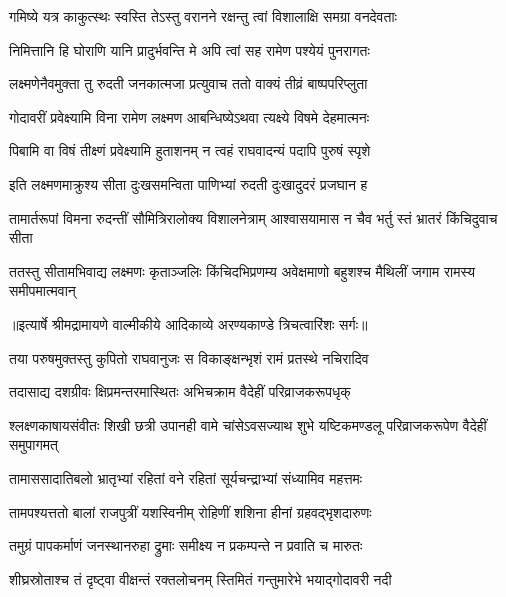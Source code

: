 \twolineshloka
{गमिष्ये यत्र काकुत्स्थः स्वस्ति तेऽस्तु वरानने}
{रक्षन्तु त्वां विशालाक्षि समग्रा वनदेवताः} %

\twolineshloka
{निमित्तानि हि घोराणि यानि प्रादुर्भवन्ति मे}
{अपि त्वां सह रामेण पश्येयं पुनरागतः} %

\twolineshloka
{लक्ष्मणेनैवमुक्ता तु रुदती जनकात्मजा}
{प्रत्युवाच ततो वाक्यं तीव्रं बाष्पपरिप्लुता} %

\twolineshloka
{गोदावरीं प्रवेक्ष्यामि विना रामेण लक्ष्मण}
{आबन्धिष्येऽथवा त्यक्ष्ये विषमे देहमात्मनः} %

\twolineshloka
{पिबामि वा विषं तीक्ष्णं प्रवेक्ष्यामि हुताशनम्}
{न त्वहं राघवादन्यं पदापि पुरुषं स्पृशे} %

\twolineshloka
{इति लक्ष्मणमाक्रुश्य सीता दुःखसमन्विता}
{पाणिभ्यां रुदती दुःखादुदरं प्रजघान ह} %

\fourlineindentedshloka
{तामार्तरूपां विमना रुदन्तीं}
{ सौमित्रिरालोक्य विशालनेत्राम्}
{आश्वासयामास न चैव भर्तु}
{स्तं भ्रातरं किंचिदुवाच सीता} %

\fourlineindentedshloka
{ततस्तु सीतामभिवाद्य लक्ष्मणः}
{ कृताञ्जलिः किंचिदभिप्रणम्य}
{अवेक्षमाणो बहुशश्च मैथिलीं}
{ जगाम रामस्य समीपमात्मवान्} %


{॥इत्यार्षे श्रीमद्रामायणे वाल्मीकीये आदिकाव्ये अरण्यकाण्डे त्रिचत्वारिंशः सर्गः॥}


\twolineshloka
{तया परुषमुक्तस्तु कुपितो राघवानुजः}
{स विकाङ्क्षन्भृशं रामं प्रतस्थे नचिरादिव} %

\twolineshloka
{तदासाद्य दशग्रीवः क्षिप्रमन्तरमास्थितः}
{अभिचक्राम वैदेहीं परिव्राजकरूपधृक्} %

\threelineshloka
{श्लक्ष्णकाषायसंवीतः शिखी छत्री उपानही}
{वामे चांसेऽवसज्याथ शुभे यष्टिकमण्डलू}
{परिव्राजकरूपेण वैदेहीं समुपागमत्} %

\twolineshloka
{तामाससादातिबलो भ्रातृभ्यां रहितां वने}
{रहितां सूर्यचन्द्राभ्यां संध्यामिव महत्तमः} %

\twolineshloka
{तामपश्यत्ततो बालां राजपुत्रीं यशस्विनीम्}
{रोहिणीं शशिना हीनां ग्रहवद्भृशदारुणः} %

\twolineshloka
{तमुग्रं पापकर्माणं जनस्थानरुहा द्रुमाः}
{समीक्ष्य न प्रकम्पन्ते न प्रवाति च मारुतः} %

\twolineshloka
{शीघ्रस्रोताश्च तं दृष्ट्वा वीक्षन्तं रक्तलोचनम्}
{स्तिमितं गन्तुमारेभे भयाद्गोदावरी नदी} %

